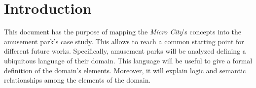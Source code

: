 \section*{Introduction}
\label{sec:introduction}

This document has the purpose of mapping the \textit{Micro City}'s concepts into the amusement park's case study.
This allows to reach a common starting point for different future works.
Specifically, amusement parks will be analyzed defining a ubiquitous language of their domain.
This language will be useful to give a formal definition of the domain's elements.
Moreover, it will explain logic and semantic relationships among the elements of the domain.

